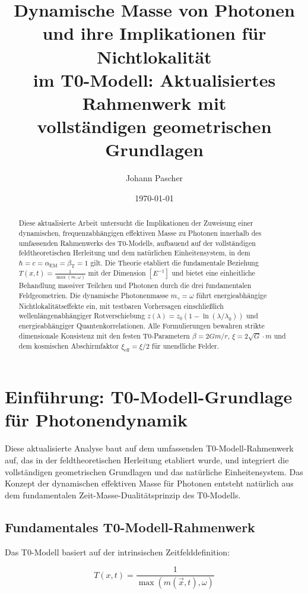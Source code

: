 \documentclass[12pt,a4paper]{article}
\title{Dynamische Masse von Photonen und ihre Implikationen für Nichtlokalität \\ im T0-Modell: Aktualisiertes Rahmenwerk mit \\ vollständigen geometrischen Grundlagen}
\author{Johann Pascher}
\date{\today}
\newcommand{\Tfield}{T(x,t)}
\begin{document}
	
	\maketitle
	
	\begin{abstract}
		Diese aktualisierte Arbeit untersucht die Implikationen der Zuweisung einer dynamischen, frequenzabhängigen effektiven Masse zu Photonen innerhalb des umfassenden Rahmenwerks des T0-Modells, aufbauend auf der vollständigen feldtheoretischen Herleitung und dem natürlichen Einheitensystem, in dem $\hbar = c = \alpha_{\text{EM}} = \beta_{\text{T}} = 1$ gilt. Die Theorie etabliert die fundamentale Beziehung $\Tfield = \frac{1}{\max(m, \omega)}$ mit der Dimension $[E^{-1}]$ und bietet eine einheitliche Behandlung massiver Teilchen und Photonen durch die drei fundamentalen Feldgeometrien. Die dynamische Photonenmasse $m_\gamma = \omega$ führt energieabhängige Nichtlokalitätseffekte ein, mit testbaren Vorhersagen einschließlich wellenlängenabhängiger Rotverschiebung $z(\lambda) = z_0(1 - \ln(\lambda/\lambda_0))$ und energieabhängiger Quantenkorrelationen. Alle Formulierungen bewahren strikte dimensionale Konsistenz mit den festen T0-Parametern $\beta = 2Gm/r$, $\xi = 2\sqrt{G} \cdot m$ und dem kosmischen Abschirmfaktor $\xi_{\text{eff}} = \xi/2$ für unendliche Felder.
	\end{abstract}
	
	\tableofcontents
	\newpage
	
	\section{Einführung: T0-Modell-Grundlage für Photonendynamik}
	
	Diese aktualisierte Analyse baut auf dem umfassenden T0-Modell-Rahmenwerk auf, das in der feldtheoretischen Herleitung etabliert wurde, und integriert die vollständigen geometrischen Grundlagen und das natürliche Einheitensystem. Das Konzept der dynamischen effektiven Masse für Photonen entsteht natürlich aus dem fundamentalen Zeit-Masse-Dualitätsprinzip des T0-Modells.
	
	\subsection{Fundamentales T0-Modell-Rahmenwerk}
	
	Das T0-Modell basiert auf der intrinsischen Zeitfelddefinition:
	
	\begin{equation}
		\boxed{\Tfield = \frac{1}{\max(m(\vec{x},t), \omega)}}
		\label{eq:intrinsic_time_field}
	\end{equation}
	
\end{document}

